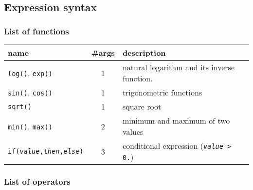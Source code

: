 \subsection{Expression syntax}

\subsubsection{List of functions}

\begin{tabular}{|l|c|p{7cm}|}
  \hline
  name                           & \#args & description \\
  \hline\hline
  \texttt{log()}, \texttt{exp()} & 1                & natural logarithm and its inverse function. \\
  \texttt{sin()}, \texttt{cos()} & 1                & trigonometric functions                     \\
  \texttt{sqrt()}                & 1                & square root                                 \\
  \texttt{min()}, \texttt{max()} & 2                & minimum and maximum of two values           \\
  \texttt{if(\textit{value},\textit{then},\textit{else})} & 3 & conditional expression 
                                                      (\texttt{\textit{value} > 0.})              \\
  \hline
\end{tabular}


\subsubsection{List of operators}


